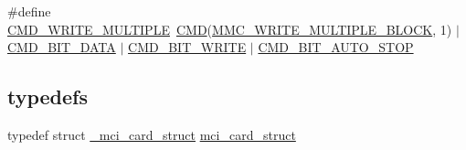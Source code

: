 \begin{DoxyCompactItemize}
\#define \hyperlink{group___s_d_m_m_c__18_x_x__43_x_x_ga73e19a429898d5056eac01f19d11bcae}{C\+M\+D\+\_\+\+W\+R\+I\+T\+E\+\_\+\+M\+U\+L\+T\+I\+P\+LE}~\hyperlink{group___s_d_m_m_c__18_x_x__43_x_x_ga7caafa608408eea45aca375d0d5eb211}{C\+MD}(\hyperlink{group___c_h_i_p___s_d_m_m_c___definitions_ga791b2d417011f16319822320507e69fb}{M\+M\+C\+\_\+\+W\+R\+I\+T\+E\+\_\+\+M\+U\+L\+T\+I\+P\+L\+E\+\_\+\+B\+L\+O\+CK}, 1) $\vert$ \hyperlink{group___s_d_m_m_c__18_x_x__43_x_x_gac4b629fb5a202bac675389cf3e28a197}{C\+M\+D\+\_\+\+B\+I\+T\+\_\+\+D\+A\+TA} $\vert$ \hyperlink{group___s_d_m_m_c__18_x_x__43_x_x_ga78e0e4e25dd9e13cdcbecc9f396b2150}{C\+M\+D\+\_\+\+B\+I\+T\+\_\+\+W\+R\+I\+TE} $\vert$ \hyperlink{group___s_d_m_m_c__18_x_x__43_x_x_ga54467a0e80fd68c54419d4e6598c05d8}{C\+M\+D\+\_\+\+B\+I\+T\+\_\+\+A\+U\+T\+O\+\_\+\+S\+T\+OP}
\end{DoxyCompactItemize}
\subsection*{\textquotesingle{}typedefs\textquotesingle{}}
\begin{DoxyCompactItemize}
\item 
typedef struct \hyperlink{struct__mci__card__struct}{\+\_\+mci\+\_\+card\+\_\+struct} \hyperlink{group___s_d_m_m_c__18_x_x__43_x_x_gaa558c8e6f8957a2a9014f575b7beabe5}{mci\+\_\+card\+\_\+struct}
\end{DoxyCompactItemize}
